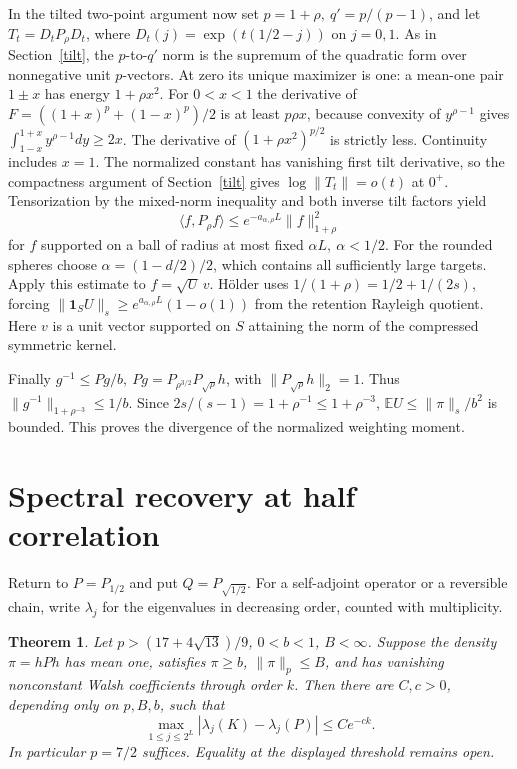 \documentclass[11pt]{article}
\newtheorem{theorem}{Theorem}[section]
\newcommand{\E}{\mathbb E}
\newcommand{\one}{\mathbf 1}
\begin{document}
In the tilted two-point argument now set \(p=1+\rho,\ q'=p/(p-1)\), and let \(T_t=D_t P_\rho D_t\), where \(D_t(j)=\exp(t(1/2-j))\) on \(j=0,1\). As in Section~\ref{tilt}, the \(p\)-to-\(q'\) norm is the supremum of the quadratic form over nonnegative unit \(p\)-vectors. At zero its unique maximizer is one: a mean-one pair \(1\pm x\) has energy \(1+\rho x^2\). For \(0<x<1\) the derivative of \(F=((1+x)^p+(1-x)^p)/2\) is at least \(p\rho x\), because convexity of \(y^{\rho-1}\) gives \(\int_{1-x}^{1+x}y^{\rho-1}dy\ge2x\). The derivative of \((1+\rho x^2)^{p/2}\) is strictly less. Continuity includes \(x=1\). The normalized constant has vanishing first tilt derivative, so the compactness argument of Section~\ref{tilt} gives \(\log\|T_t\|=o(t)\) at \(0^+\). Tensorization by the mixed-norm inequality and both inverse tilt factors yield
\[
 \langle f,P_\rho f\rangle\le e^{-a_{\alpha,\rho}L}\|f\|_{1+\rho}^2
\]
for \(f\) supported on a ball of radius at most fixed \(\alpha L,\ \alpha<1/2\). For the rounded spheres choose \(\alpha=(1-d/2)/2\), which contains all sufficiently large targets. Apply this estimate to \(f=\sqrt U\,v\). Hölder uses \(1/(1+\rho)=1/2+1/(2s)\), forcing \(\|\one_SU\|_s\ge e^{a_{\alpha,\rho}L}(1-o(1))\) from the retention Rayleigh quotient. Here \(v\) is a unit vector supported on \(S\) attaining the norm of the compressed symmetric kernel.

Finally \(g^{-1}\le Pg/b,\ Pg=P_{\rho^{3/2}}P_{\sqrt\rho}h\), with \(\|P_{\sqrt\rho}h\|_2=1\). Thus \(\|g^{-1}\|_{1+\rho^{-3}}\le1/b\). Since \(2s/(s-1)=1+\rho^{-1}\le1+\rho^{-3}\), \(\E U\le\|\pi\|_s/b^2\) is bounded. This proves the divergence of the normalized weighting moment.

\section{Spectral recovery at half correlation}
Return to \(P=P_{1/2}\) and put \(Q=P_{\sqrt{1/2}}\). For a self-adjoint operator or a reversible chain, write \(\lambda_j\) for the eigenvalues in decreasing order, counted with multiplicity.
\begin{theorem}\label{recovery}
Let \(p>(17+4\sqrt{13})/9\), \(0<b<1\), \(B<\infty\). Suppose the density \(\pi=hPh\) has mean one, satisfies \(\pi\ge b\), \(\|\pi\|_p\le B\), and has vanishing nonconstant Walsh coefficients through order \(k\). Then there are \(C,c>0\), depending only on \(p,B,b\), such that
\[
 \max_{1\le j\le 2^L}|\lambda_j(K)-\lambda_j(P)|\le C e^{-ck}.
\]
In particular \(p=7/2\) suffices. Equality at the displayed threshold remains open.
\end{theorem}
\end{document}
